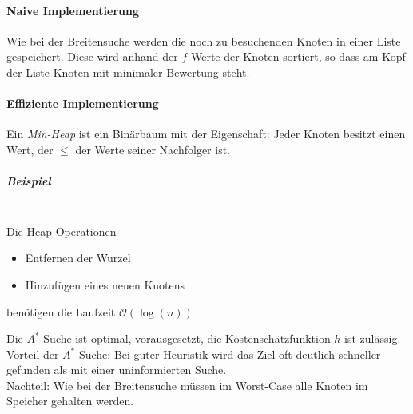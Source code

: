 \documentclass[a4paper]{scrartcl}
\begin{document}
\paragraph{Naive Implementierung} Wie bei der Breitensuche werden die noch zu besuchenden Knoten in einer Liste gespeichert. Diese wird anhand der $f$-Werte der Knoten sortiert, so dass am Kopf der Liste Knoten mit minimaler Bewertung steht.

\paragraph{Effiziente Implementierung} Ein \emph{Min-Heap} ist ein Binärbaum mit der Eigenschaft: Jeder Knoten besitzt einen Wert, der $\leq$ der Werte seiner Nachfolger ist.

\subparagraph{Beispiel}
\\
Die Heap-Operationen
\begin{itemize}
\item Entfernen der Wurzel
\item Hinzufügen eines neuen Knotens
\end{itemize} benötigen die Laufzeit $\mathcal{O} (\log{(n)})$

Die $A^*$-Suche ist optimal, vorausgesetzt, die Kostenschätzfunktion $h$ ist zulässig.\\
Vorteil der $A^*$-Suche: Bei guter Heuristik wird das Ziel oft deutlich schneller gefunden als mit einer uninformierten Suche.\\
Nachteil: Wie bei der Breitensuche müssen im Worst-Case alle Knoten im Speicher gehalten werden.
\end{document}
